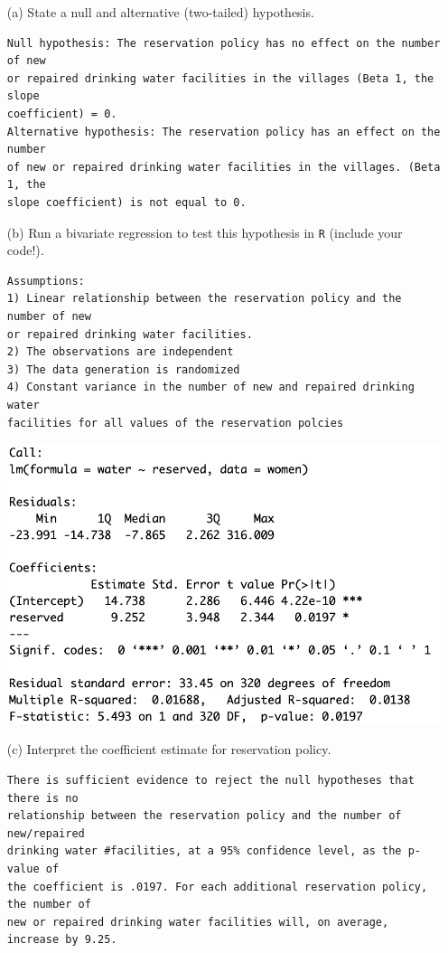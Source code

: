 \documentclass[12pt,letterpaper]{article}
\begin{document}
\newpage
\begin{enumerate}
	\item [(a)] State a null and alternative (two-tailed) hypothesis. 
	
	
\begin{verbatim}
Null hypothesis: The reservation policy has no effect on the number of new 
or repaired drinking water facilities in the villages (Beta 1, the slope
coefficient) = 0. 
Alternative hypothesis: The reservation policy has an effect on the number 
of new or repaired drinking water facilities in the villages. (Beta 1, the 
slope coefficient) is not equal to 0. 

\end{verbatim}
		
	\vspace{3cm}
	\item [(b)] Run a bivariate regression to test this hypothesis in \texttt{R} (include your code!).
	
			

\begin{verbatim}
Assumptions: 
1) Linear relationship between the reservation policy and the number of new 
or repaired drinking water facilities.
2) The observations are independent
3) The data generation is randomized
4) Constant variance in the number of new and repaired drinking water 
facilities for all values of the reservation polcies

\end{verbatim}

\includegraphics[width=.75\textwidth]{regression_summary.png}






	\vspace{3cm}
	\item [(c)] Interpret the coefficient estimate for reservation policy. 
	
\begin{verbatim}
There is sufficient evidence to reject the null hypotheses that there is no
relationship between the reservation policy and the number of new/repaired
drinking water #facilities, at a 95% confidence level, as the p-value of 
the coefficient is .0197. For each additional reservation policy, the number of 
new or repaired drinking water facilities will, on average, increase by 9.25.
\end{verbatim}

\end{enumerate}
\end{document}
